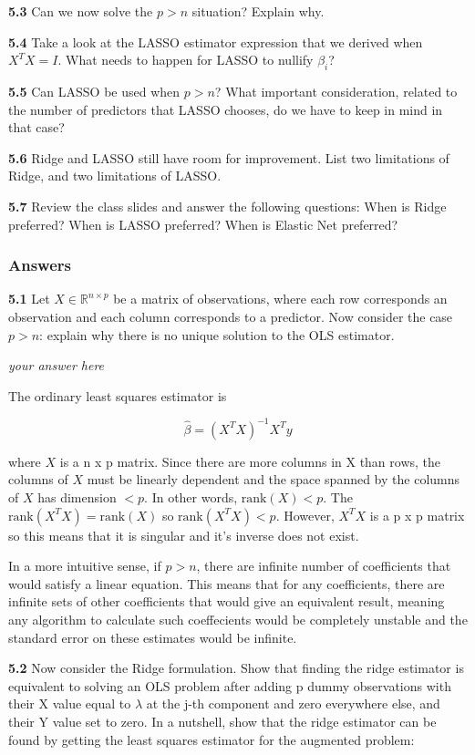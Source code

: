 \documentclass[11pt]{article}
\begin{document}
\textbf{5.3} Can we now solve the \(p > n\) situation? Explain why.

\textbf{5.4} Take a look at the LASSO estimator expression that we
derived when \(X^TX=I\). What needs to happen for LASSO to nullify
\(\beta_i\)?

\textbf{5.5} Can LASSO be used when \(p>n\)? What important
consideration, related to the number of predictors that LASSO chooses,
do we have to keep in mind in that case?

\textbf{5.6} Ridge and LASSO still have room for improvement. List two
limitations of Ridge, and two limitations of LASSO.

\textbf{5.7} Review the class slides and answer the following questions:
When is Ridge preferred? When is LASSO preferred? When is Elastic Net
preferred?

    \subsubsection{Answers}\label{answers}

    \textbf{5.1} Let \(X\in \mathbb{R}^{n\times p}\) be a matrix of
observations, where each row corresponds an observation and each column
corresponds to a predictor. Now consider the case \(p > n\): explain why
there is no unique solution to the OLS estimator.

    \emph{your answer here}

The ordinary least squares estimator is

\[
\hat{\beta} = (X^TX)^{-1}X^Ty
\]

where \(X\) is a n x p matrix. Since there are more columns in X than
rows, the columns of \(X\) must be linearly dependent and the space
spanned by the columns of \(X\) has dimension \(< p\). In other words,
\(\text{rank}(X)<p\). The \(\text{rank}(X^TX) = \text{rank}(X)\) so
\(\text{rank}(X^TX) < p\). However, \(X^TX\) is a p x p matrix so this
means that it is singular and it's inverse does not exist.

In a more intuitive sense, if \(p > n\), there are infinite number of
coefficients that would satisfy a linear equation. This means that for
any coefficients, there are infinite sets of other coefficients that
would give an equivalent result, meaning any algorithm to calculate such
coeffecients would be completely unstable and the standard error on
these estimates would be infinite.

    \textbf{5.2} Now consider the Ridge formulation. Show that finding the
ridge estimator is equivalent to solving an OLS problem after adding p
dummy observations with their X value equal to \(\lambda\) at the j-th
component and zero everywhere else, and their Y value set to zero. In a
nutshell, show that the ridge estimator can be found by getting the
least squares estimator for the augmented problem:
\end{document}
